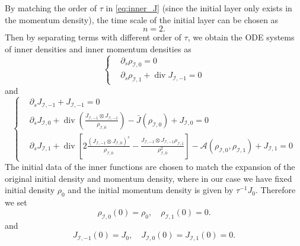 \documentclass[english]{amsart}
\theoremstyle{plain}
\theoremstyle{definition}
\theoremstyle{remark}
\theoremstyle{plain}
\theoremstyle{plain}
\theoremstyle{plain}
\def\d{{\partial}}
\DeclareMathOperator{\diver}{div}
\numberwithin{equation}{section}
\begin{document}
By matching the order of $\tau$ in \eqref{eq:inner_J} (since the initial layer only exists in the momentum density), the time scale of the initial layer can be chosen as
\[
n=2.
\]
Then by separating terms with different order of $\tau$, we obtain the ODE systems of inner densities and inner momentum densities as
\begin{equation}\label{eq:innereq_rho}
\left\{\begin{aligned}
&\d_s\rho_{\mathcal{I},0}=0\\
&\d_s\rho_{\mathcal{I},1}+\diver J_{\mathcal{I},-1}=0
\end{aligned}\right.
\end{equation}
and
\begin{equation}\label{eq:innereq_J}
\left\{\begin{aligned}
&\d_sJ_{\mathcal{I},-1}+J_{\mathcal{I},-1}=0\\
&\d_sJ_{\mathcal{I},0}+\diver\left(\frac{J_{\mathcal{I},-1}\otimes J_{\mathcal{I},-1}}{\rho_{\mathcal{I},0}}\right)-\bar J(\rho_{\mathcal{I},0})+J_{\mathcal{I},0}=0\\
&\d_s J_{\mathcal{I},1}+\diver \left[2\frac{(J_{\mathcal{I},-1}\otimes J_{\mathcal{I},0})^s}{\rho_{\mathcal{I},0}}-\frac{J_{\mathcal{I},-1}\otimes J_{\mathcal{I},-1}\rho_{\mathcal{I},1}}{\rho_{\mathcal{I},0}^2}\right]-\mathcal{A}(\rho_{\mathcal{I},0},\rho_{\mathcal{I},1})+J_{\mathcal{I},1}=0
\end{aligned}\right.
\end{equation}
The initial data of the inner functions are chosen to match the expansion of the original initial density and momentum density, where in our case we have fixed initial density $\rho_0$ and the initial momentum density is given by $\tau^{-1}J_0$. Therefore we set
\begin{equation}
\rho_{\mathcal{I},0}(0)=\rho_0,\quad \rho_{\mathcal{I},1}(0)=0.
\end{equation}
and
\begin{equation}
J_{\mathcal{I},-1}(0)=J_0,\quad J_{\mathcal{I},0}(0)=J_{\mathcal{I},1}(0)=0.
\end{equation}
\end{document}
